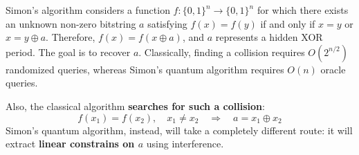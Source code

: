 \begin{takeawaysbox}
    Simon's algorithm considers a function $f:\{0,1\}^n\rightarrow\{0,1\}^n$ for which there exists an unknown non-zero bitstring $a$ satisfying $f(x)=f(y)$ if and only if $x=y$ or $x=y\oplus a$. Therefore, $f(x)=f(x\oplus a)$, and $a$ represents a hidden XOR period. The goal is to recover $a$. Classically, finding a collision requires $O(2^{n/2})$ randomized queries, whereas Simon's quantum algorithm requires $O(n)$ oracle queries.

    \highspace
    Also, the classical algorithm \textbf{searches for such a collision}:
    \begin{equation*}
        f(x_1) = f(x_2), \quad x_1 \neq x_2 \quad \Rightarrow \quad a = x_1 \oplus x_2
    \end{equation*}
    Simon's quantum algorithm, instead, will take a completely different route: it will extract \textbf{linear constrains on $a$} using interference.
\end{takeawaysbox}
